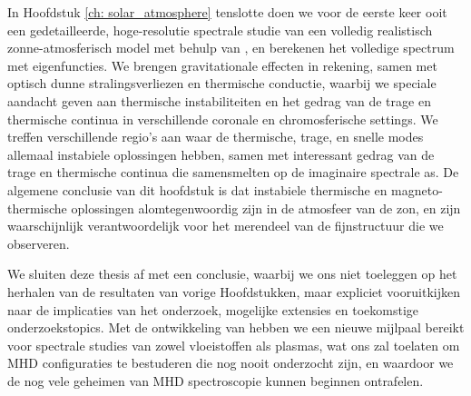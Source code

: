 In Hoofdstuk \ref{ch: solar_atmosphere} tenslotte doen we voor de eerste keer ooit een gedetailleerde, hoge-resolutie spectrale studie van een volledig realistisch zonne-atmosferisch model met behulp van {\legolas}, en berekenen het volledige spectrum met eigenfuncties. We brengen gravitationale effecten in rekening, samen met optisch dunne stralingsverliezen en thermische conductie, waarbij we speciale aandacht geven aan thermische instabiliteiten en het gedrag van de trage en thermische continua in verschillende coronale en chromosferische settings. We treffen verschillende regio's aan waar de thermische, trage, en snelle modes allemaal instabiele oplossingen hebben, samen met interessant gedrag van de trage en thermische continua die samensmelten op de imaginaire spectrale as. De algemene conclusie van dit hoofdstuk is dat instabiele thermische en magneto-thermische oplossingen alomtegenwoordig zijn in de atmosfeer van de zon, en zijn waarschijnlijk verantwoordelijk voor het merendeel van de fijnstructuur die we observeren.

We sluiten deze thesis af met een conclusie, waarbij we ons niet toeleggen op het herhalen van de resultaten van vorige Hoofdstukken, maar expliciet vooruitkijken naar de implicaties van het onderzoek, mogelijke extensies en toekomstige onderzoekstopics. Met de ontwikkeling van {\legolas} hebben we een nieuwe mijlpaal bereikt voor spectrale studies van zowel vloeistoffen als plasmas, wat ons zal toelaten om MHD configuraties te bestuderen die nog nooit onderzocht zijn, en waardoor we de nog vele geheimen van MHD spectroscopie kunnen beginnen ontrafelen.


\cleardoublepage
